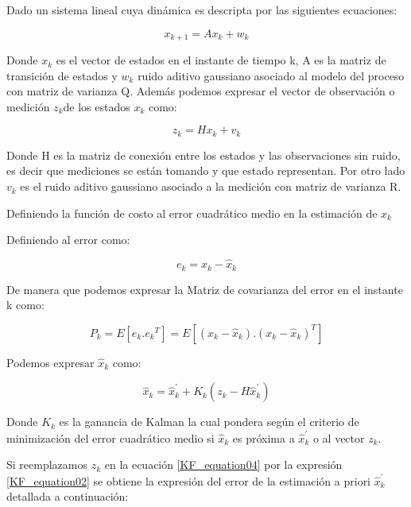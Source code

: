 \documentclass[10pt,a4paper]{article}
\begin{document}
	Dado un sistema lineal cuya dinámica es descripta por las siguientes ecuaciones:
	
	\begin{equation}
		x_{k+1}= Ax_{k} + w_{k}
		\label{KF_equation01}
	\end{equation}	
	
	Donde $x_{k}$ es el vector de estados en el instante de tiempo k, A es la matriz de transición de estados y $w_{k}$ ruido aditivo gaussiano asociado al modelo del proceso con matriz de varianza Q. 
	Además podemos expresar el vector de observación o medición $z_{k} $de los estados $x_{k}$ como:
	
	\begin{equation}
		z_{k}= Hx_{k} + v_{k}
		\label{KF_equation02}
	\end{equation}	
	
	Donde H es la matriz de conexión entre los estados y las observaciones sin ruido, es decir que mediciones se están tomando y que estado representan. Por otro lado $v_{k}$ es el ruido aditivo gaussiano asociado a la medición con matriz de varianza R.
	
	Definiendo la función de costo al error cuadrático medio en la estimación de $x_k$ 
	
	Definiendo al error como: 
	
	\begin{equation}
		e_{k} = x_k  - \hat{x}_k
		\label{KF_error}
	\end{equation}	
	
	De manera que podemos expresar la Matriz de covarianza del error en el instante k como:
	
	\begin{equation}
		P_{k} = E[e_k.{e_k}^{T}] = E[(x_k-\hat{x}_k).(x_k-\hat{x}_k)^{T}]
		\label{KF_equation03}
	\end{equation}	
	
	Podemos expresar $\hat{x}_k$ como: 
	
	\begin{equation}
		\hat{x}_k = \hat{x}^\prime_k + K_k (z_k - H\hat{x}^\prime_k)
		\label{KF_equation04}
	\end{equation}	
	
	Donde $K_k$ es la ganancia de Kalman la cual pondera según el criterio de minimización del error cuadrático medio si $\hat{x}_k$ es próxima a $\hat{x}^\prime_k$ o al vector $z_k$.
	
	Si reemplazamos $z_k$ en la ecuación \ref{KF_equation04} por la expresión \ref{KF_equation02} se obtiene la expresión del error de la estimación a priori $\hat{x}^\prime_k$ detallada a continuación:
	
\end{document}

